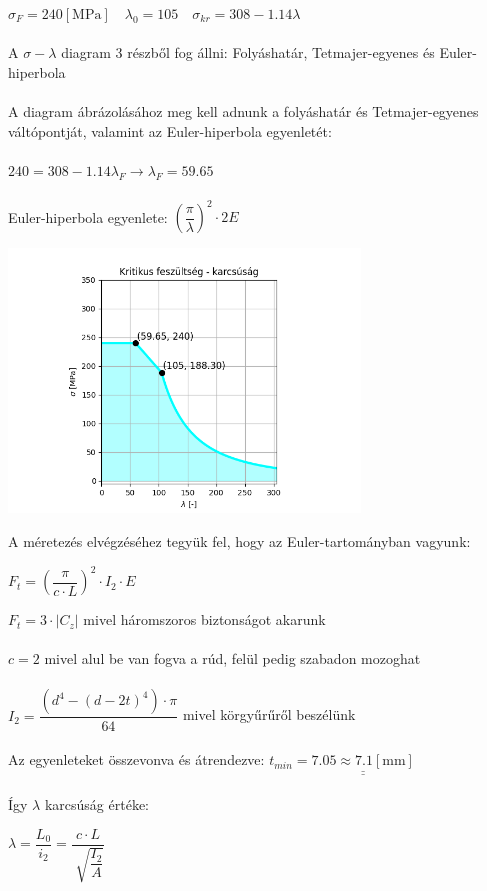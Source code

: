 \documentclass[10pt, a4paper]{article}
\newcommand{\harom}{\begin{trivlist}\item[\hskip \labelsep {\bfseries 
			{3. Feladat:}}]\end{trivlist}}
\newcommand{\mm}{\mathrm{\left[mm\right]}}
\newcommand{\mpa}{\mathrm{\left[MPa\right]}}
\begin{document}
	\newpage
	\harom
	$\sigma_F = 240 \mpa \quad \lambda_0 = 105 \quad \sigma_{kr}=308 - 1.14\lambda$\\\\
	A $\sigma - \lambda$ diagram 3 részből fog állni: Folyáshatár, Tetmajer-egyenes és Euler-hiperbola\\\\
	A diagram ábrázolásához meg kell adnunk a folyáshatár és Tetmajer-egyenes váltópontját, valamint az Euler-hiperbola egyenletét:\\\\
	$ 240 = 308 - 1.14\lambda_F \xrightarrow{} \lambda_F = 59.65$\\\\
	Euler-hiperbola egyenlete: $\left( \dfrac{\pi}{\lambda} \right)^2 \cdot 2E$
	\begin{center}
		\includegraphics[width=265pt]{ krfesz.png }
	\end{center}
	A méretezés elvégzéséhez tegyük fel, hogy az Euler-tartományban vagyunk:
	\begin{center}
		$F_t = \left( \dfrac{\pi}{c \cdot L} \right)^2 \cdot I_2 \cdot E$
	\end{center} 
	$F_t = 3 \cdot |C_z|$ mivel háromszoros biztonságot akarunk\\\\
	$c = 2$ mivel alul be van fogva a rúd, felül pedig szabadon mozoghat\\\\
	$I_2 = \dfrac{(d^4 - (d-2t)^4) \cdot \pi}{64}$ mivel körgyűrűről beszélünk\\\\
	Az egyenleteket összevonva és átrendezve: $t_{min} = \underline{\underline{7.05 \approx 7.1 \mm}}$\\\\
	Így $\lambda$ karcsúság értéke:
	\begin{center}
		$\lambda = \dfrac{L_0}{i_2} = \dfrac{c \cdot L}{\sqrt[]{\dfrac{I_2}{A}}}$
	\end{center}
\end{document}
